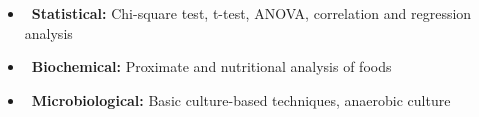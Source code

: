 
\begin{itemize}
    \item[] \textbullet\, \textbf{Statistical:} Chi-square test, t-test, ANOVA, correlation and regression analysis
    \item[] \textbullet\, \textbf{Biochemical:} Proximate and nutritional analysis of foods
    \item[] \textbullet\, \textbf{Microbiological:} Basic culture-based techniques, anaerobic culture
\end{itemize}
















